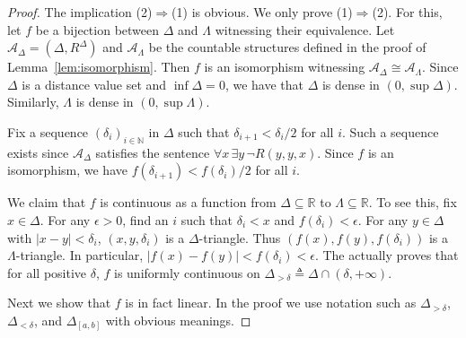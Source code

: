 \documentclass[10pt,a4paper]{amsart}
\theoremstyle{definition}
\theoremstyle{remark}
\begin{document}
\begin{proof} The implication (2)$\Rightarrow$(1) is obvious. We only prove (1)$\Rightarrow$(2). For this, let $f$ be a bijection between $\Delta$ and $\Lambda$ witnessing their equivalence. Let $\mathcal{A}_\Delta=(\Delta, R^\Delta)$ and $\mathcal{A}_\Lambda$ be the countable structures defined in the proof of Lemma~\ref{lem:isomorphism}. Then $f$ is an isomorphism witnessing $\mathcal{A}_\Delta\cong \mathcal{A}_\Lambda$. Since $\Delta$ is a distance value set and $\inf\Delta=0$, we have that $\Delta$ is dense in $(0, \sup\Delta)$. Similarly, $\Lambda$ is dense in $(0, \sup\Lambda)$.

Fix a sequence $(\delta_i)_{i\in\mathbb{N}}$ in $\Delta$ such that $\delta_{i+1} < {\delta_i}/{2}$ for all $i$. Such a sequence exists since $\mathcal{A}_\Delta$ satisfies the sentence $\forall x\,\exists y\,\neg R(y,y,x)$. Since $f$ is an isomorphism, we have $f(\delta_{i+1})<{f(\delta_i)}/{2}$ for all $i$. 

We claim that $f$ is continuous as a function from $\Delta\subseteq\mathbb{R}$ to $\Lambda\subseteq\mathbb{R}$. To see this,  
fix $x \in \Delta$. For any $\epsilon > 0$, find an $i$ such that $\delta_i < x$ and $f(\delta_i) < \epsilon$. For any $y \in \Delta$ with $|x - y| < \delta_i$, $(x,y,\delta_i)$ is a $\Delta$-triangle. Thus $(f(x), f(y),f(\delta_i))$ is a $\Lambda$-triangle. In particular, $|f(x)-f(y)|<f(\delta_i)<\epsilon$. The actually proves that for all positive $\delta$, $f$ is uniformly continuous on $\Delta_{>\delta}\triangleq \Delta\cap (\delta,+\infty)$. 

Next we show that $f$ is in fact linear. In the proof we use notation such as $\Delta_{>\delta}$, $\Delta_{<\delta}$, and $\Delta_{[a,b]}$ with obvious meanings.

     
   

\end{proof}
\end{document}
